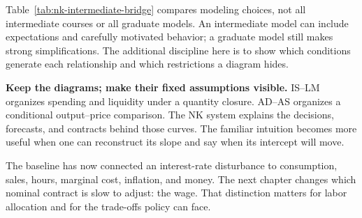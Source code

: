 Table~\ref{tab:nk-intermediate-bridge} compares modeling choices, not all
intermediate courses or all graduate models. An intermediate model can include
expectations and carefully motivated behavior; a graduate model still makes
strong simplifications. The additional discipline here is to show which
conditions generate each relationship and which restrictions a diagram hides.

\begin{greenblock}
\textbf{Keep the diagrams; make their fixed assumptions visible.}
IS--LM organizes spending and liquidity under a quantity closure. AD--AS organizes
a conditional output--price comparison. The NK system explains the decisions,
forecasts, and contracts behind those curves. The familiar intuition becomes
more useful when one can reconstruct its slope and say when its intercept
will move.
\end{greenblock}

The baseline has now connected an interest-rate disturbance to consumption,
sales, hours, marginal cost, inflation, and money. The next chapter changes
which nominal contract is slow to adjust: the wage. That distinction matters
for labor allocation and for the trade-offs policy can face.
